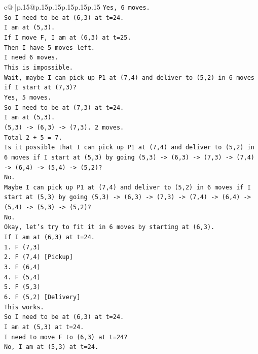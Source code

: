 \documentclass{article}
\begin{document}
{\begin{supertabular}{c@{$\;$}|p{.15\linewidth}@{}p{.15\linewidth}p{.15\linewidth}p{.15\linewidth}p{.15\linewidth}p{.15\linewidth}}
{{{\texttt{Yes, 6 moves.} \\
\texttt{So I need to be at (6,3) at t=24.} \\
\texttt{I am at (5,3).} \\
\texttt{If I move F, I am at (6,3) at t=25.} \\
\texttt{Then I have 5 moves left.} \\
\texttt{I need 6 moves.} \\
\texttt{This is impossible.} \\
\texttt{Wait, maybe I can pick up P1 at (7,4) and deliver to (5,2) in 6 moves if I start at (7,3)?} \\
\texttt{Yes, 5 moves.} \\
\texttt{So I need to be at (7,3) at t=24.} \\
\texttt{I am at (5,3).} \\
\texttt{(5,3) {-}> (6,3) {-}> (7,3). 2 moves.} \\
\texttt{Total 2 + 5 = 7.} \\
\texttt{Is it possible that I can pick up P1 at (7,4) and deliver to (5,2) in 6 moves if I start at (5,3) by going (5,3) {-}> (6,3) {-}> (7,3) {-}> (7,4) {-}> (6,4) {-}> (5,4) {-}> (5,2)?} \\
\texttt{No.} \\
\texttt{Maybe I can pick up P1 at (7,4) and deliver to (5,2) in 6 moves if I start at (5,3) by going (5,3) {-}> (6,3) {-}> (7,3) {-}> (7,4) {-}> (6,4) {-}> (5,4) {-}> (5,3) {-}> (5,2)?} \\
\texttt{No.} \\
\texttt{Okay, let's try to fit it in 6 moves by starting at (6,3).} \\
\texttt{If I am at (6,3) at t=24.} \\
\texttt{1. F (7,3)} \\
\texttt{2. F (7,4) {[}Pickup{]}} \\
\texttt{3. F (6,4)} \\
\texttt{4. F (5,4)} \\
\texttt{5. F (5,3)} \\
\texttt{6. F (5,2) {[}Delivery{]}} \\
\texttt{This works.} \\
\texttt{So I need to be at (6,3) at t=24.} \\
\texttt{I am at (5,3) at t=24.} \\
\texttt{I need to move F to (6,3) at t=24?} \\
\texttt{No, I am at (5,3) at t=24.} \\
}}}
\end{supertabular}}
\end{document}
